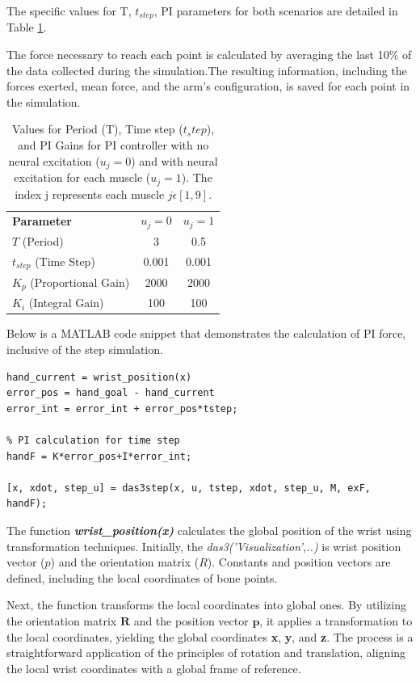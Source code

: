 The specific values for T, $t_{step}$, PI parameters for both scenarios are detailed in Table \ref{tab:PI}.

The force necessary to reach each point is calculated by averaging the last 10\% of the data collected during the simulation.The resulting information, including the forces exerted, mean force, and the arm's configuration, is  saved for each point in the simulation.

\begin{table}[h]
    \centering
    \caption{Values for Period (T), Time step ($t_step$), and PI Gains for PI controller with no neural excitation ($u_j=0$) and with neural excitation for each muscle ($u_j = 1$). The index j represents each muscle $j \epsilon[1,9]$.}
    \begin{tabular}{|l|c|c|}
        \hline
        \textbf{Parameter} & \textbf{$u_j=0$} & \textbf{$u_j=1$} \\
        \(T\) (Period) & 3 & 0.5 \\
        \(t_{step}\) (Time Step) & 0.001 & 0.001 \\
        \( K_p \) (Proportional Gain) & 2000 & 2000\\
        \( K_i \) (Integral Gain)     & 100 & 100 \\
        \hline
    \end{tabular}

    \label{tab:PI}
\end{table}

\newpage
Below is a MATLAB code snippet that demonstrates the calculation of PI force, inclusive of the step simulation.

\begin{lstlisting}[style=Matlab-editor]
hand_current = wrist_position(x)
error_pos = hand_goal - hand_current
error_int = error_int + error_pos*tstep;

% PI calculation for time step
handF = K*error_pos+I*error_int;

[x, xdot, step_u] = das3step(x, u, tstep, xdot, step_u, M, exF, handF);
\end{lstlisting}

The function \textbf{\textit{wrist\_position(x)}} calculates the global position of the wrist using transformation techniques. Initially, the \textit{das3('Visualization',..)} is wrist position vector ($p$) and the orientation matrix ($R$). Constants and position vectors are defined, including the local coordinates of bone points.

Next, the function transforms the local coordinates into global ones. By utilizing the orientation matrix $\textbf{R}$ and the position vector $\textbf{p}$, it applies a transformation to the local coordinates, yielding the global coordinates \textbf{x}, \textbf{y}, and \textbf{z}. The process is a straightforward application of the principles of rotation and translation, aligning the local wrist coordinates with a global frame of reference.

